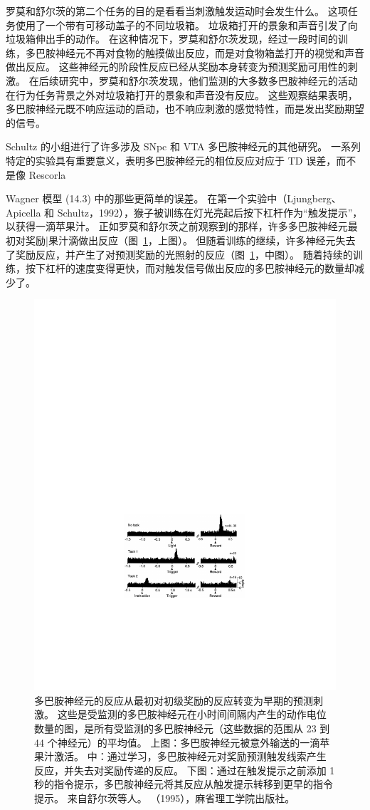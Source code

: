 罗莫和舒尔茨的第二个任务的目的是看看当刺激触发运动时会发生什么。
这项任务使用了一个带有可移动盖子的不同垃圾箱。
垃圾箱打开的景象和声音引发了向垃圾箱伸出手的动作。
在这种情况下，罗莫和舒尔茨发现，经过一段时间的训练，多巴胺神经元不再对食物的触摸做出反应，而是对食物箱盖打开的视觉和声音做出反应。
这些神经元的阶段性反应已经从奖励本身转变为预测奖励可用性的刺激。
在后续研究中，罗莫和舒尔茨发现，他们监测的大多数多巴胺神经元的活动在行为任务背景之外对垃圾箱打开的景象和声音没有反应。
这些观察结果表明，多巴胺神经元既不响应运动的启动，也不响应刺激的感觉特性，而是发出奖励期望的信号。


Schultz 的小组进行了许多涉及 SNpc 和 VTA 多巴胺神经元的其他研究。
一系列特定的实验具有重要意义，表明多巴胺神经元的相位反应对应于 TD 误差，而不是像 Rescorla{Wagner 模型 (14.3) 中的那些更简单的误差。
在第一个实验中（Ljungberg、Apicella 和 Schultz，1992），猴子被训练在灯光亮起后按下杠杆作为“触发提示”，以获得一滴苹果汁。
正如罗莫和舒尔茨之前观察到的那样，许多多巴胺神经元最初对奖励|果汁滴做出反应（图~\ref{fig:12_3}，上图）。
但随着训练的继续，许多神经元失去了奖励反应，并产生了对预测奖励的光照射的反应（图~\ref{fig:12_3}，中图）。
随着持续的训练，按下杠杆的速度变得更快，而对触发信号做出反应的多巴胺神经元的数量却减少了。


\begin{figure}[!htb]
	\centering
	\includegraphics[width=0.5\linewidth]{chap12/fig_12_3}
	\caption{多巴胺神经元的反应从最初对初级奖励的反应转变为早期的预测刺激。
		这些是受监测的多巴胺神经元在小时间间隔内产生的动作电位数量的图，是所有受监测的多巴胺神经元（这些数据的范围从 23 到 44 个神经元）的平均值。
		上图：多巴胺神经元被意外输送的一滴苹果汁激活。
		中：通过学习，多巴胺神经元对奖励预测触发线索产生反应，并失去对奖励传递的反应。
		下图：通过在触发提示之前添加 1 秒的指令提示，多巴胺神经元将其反应从触发提示转移到更早的指令提示。
		来自舒尔茨等人。 （1995），麻省理工学院出版社。
		\label{fig:12_3}}
\end{figure}



}
